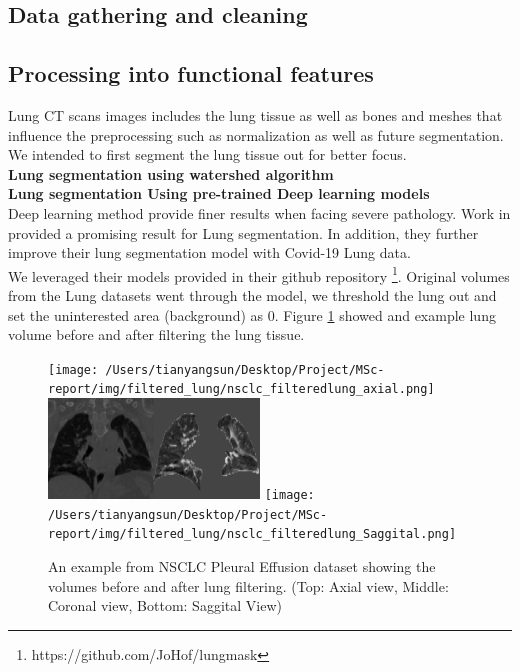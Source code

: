 \subsection{Data gathering and cleaning}

\subsection{Processing into functional features}
Lung CT scans images includes the lung tissue as well as bones and meshes that influence the preprocessing such as normalization as well as future segmentation. We intended to first segment the lung tissue out for better focus.\\
\textbf{Lung segmentation using watershed algorithm}\\

\textbf{Lung segmentation Using pre-trained Deep learning models}\\
Deep learning method provide finer results when facing severe pathology. Work in \cite{hofmanninger_automatic_2020} provided a promising result for Lung segmentation. In addition, they further improve their lung segmentation model with Covid-19 Lung data.\\

We leveraged their models provided in their github repository \footnote{https://github.com/JoHof/lungmask}. Original volumes from the Lung datasets went through the model, we threshold the lung out and set the uninterested area (background) as 0. Figure \ref{fig:filtered_Lung} showed and example lung volume before and after filtering the lung tissue.

\begin{figure}[h]
\centering
\texttt{[image: /Users/tianyangsun/Desktop/Project/MSc-report/img/filtered\_lung/nsclc\_filteredlung\_axial.png]}
\includegraphics[width=0.5\textwidth]{img/filtered_lung/nsclc_filtered_coronal.png}
\texttt{[image: /Users/tianyangsun/Desktop/Project/MSc-report/img/filtered\_lung/nsclc\_filteredlung\_Saggital.png]}
\caption{An example from NSCLC Pleural Effusion dataset showing the volumes before and after lung filtering. (Top: Axial view, Middle: Coronal view, Bottom: Saggital View)}
\label{fig:filtered_Lung}
\end{figure}

